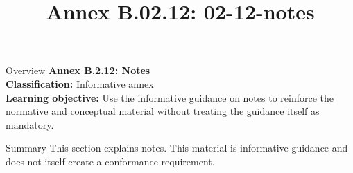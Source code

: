 \documentclass[10pt,letterpaper]{article}
\title{Annex B.02.12: 02-12-notes}
\author{}
\date{}
\begin{document}
\maketitle
\begin{CornellOverviewBox}{Overview}
{\Large\bfseries\textcolor{CNavy}{Annex B.2.12: Notes}}\\[3pt]
{\small\textbf{Classification:} Informative annex}\\
{\small\textbf{Learning objective:} Use the informative guidance on notes to reinforce the normative and conceptual material without treating the guidance itself as mandatory.}
\end{CornellOverviewBox}
\vspace{3pt}

\begin{CornellNotesTable}
\end{CornellNotesTable}


\begin{CornellSummaryBox}{Summary}
This section explains notes. This material is informative guidance and does not itself create a conformance requirement.
\end{CornellSummaryBox}
\end{document}
